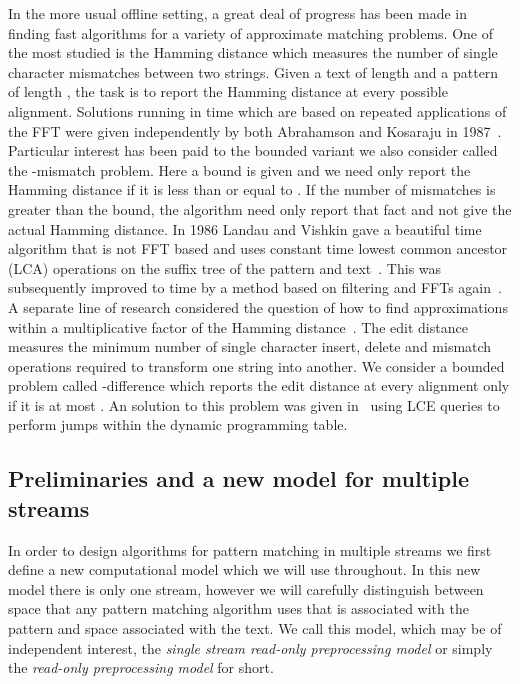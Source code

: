 \documentclass[envcountsame]{llncs}
\begin{document}
In the more usual offline setting, a great deal of progress has been made in finding fast  algorithms for
a variety of approximate matching problems. One of the most
studied is the Hamming distance which measures the number of
single character mismatches between two strings.  Given a text of length  and a
pattern of length , the task is to report the Hamming distance at
every possible alignment.   Solutions running in  time which are based
on repeated applications of the FFT were given independently by both
Abrahamson and Kosaraju in 1987~\cite{Abrahamson:1987,Kosaraju:1987}.
Particular interest has been paid to the bounded variant we also
consider called the
-mismatch problem.  Here a bound  is given and we need only
report the Hamming distance if it is less than or equal to .  If  the number of mismatches is greater than the bound, the algorithm need only report that fact and not give the actual Hamming distance. In 1986 Landau and Vishkin gave a  beautiful  time algorithm that is not FFT based and uses constant time
lowest common ancestor (LCA) operations on the suffix tree of the pattern and
text~\cite{LV:1986a}. This was subsequently  improved to  time by a method based on filtering and FFTs again~\cite{ALP:2004}.  A separate line of research considered
the question of how to find approximations within a  multiplicative factor of the Hamming distance~\cite{Indyk:1998,Karloff:1993}. The edit distance measures the minimum number of single character insert, delete and mismatch operations required to transform one string into another. We  consider a bounded problem called -difference which reports the edit distance at every alignment only if it is at most . An  solution to this problem was given in~\cite{LV:1988} using LCE queries to perform jumps within the dynamic programming table.




\subsection{Preliminaries and a new model for multiple streams}

In order to design algorithms for pattern matching in multiple streams
we first define a new computational model which we will use throughout. In this new model there is only one stream, however
we will carefully distinguish between space that any pattern matching
algorithm uses that is associated with the pattern and
space associated with the text.  We call this model, which may be of
independent interest, the \emph{single stream read-only
  preprocessing model} or simply the \emph{read-only preprocessing model} for short.
\end{document}

